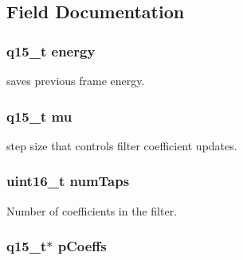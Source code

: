 \subsection{Field Documentation}
\hypertarget{structarm__lms__norm__instance__q15_ae7a8ccabc82348f6742ca7a2b3da2a41}{
\subsubsection[{energy}]{\setlength{\rightskip}{0pt plus 5cm}q15\-\_\-t energy}}\label{structarm__lms__norm__instance__q15_ae7a8ccabc82348f6742ca7a2b3da2a41}
saves previous frame energy. \hypertarget{structarm__lms__norm__instance__q15_aab4745770bd667de040227eec1b5ff8d}{
\subsubsection[{mu}]{\setlength{\rightskip}{0pt plus 5cm}q15\-\_\-t mu}}\label{structarm__lms__norm__instance__q15_aab4745770bd667de040227eec1b5ff8d}
step size that controls filter coefficient updates. \hypertarget{structarm__lms__norm__instance__q15_a751941891e47f522a7f5375fe8990aac}{
\subsubsection[{num\-Taps}]{\setlength{\rightskip}{0pt plus 5cm}uint16\-\_\-t num\-Taps}}\label{structarm__lms__norm__instance__q15_a751941891e47f522a7f5375fe8990aac}
Number of coefficients in the filter. \hypertarget{structarm__lms__norm__instance__q15_a7ca181a37f714d174445f486bebce26f}{
\subsubsection[{p\-Coeffs}]{\setlength{\rightskip}{0pt plus 5cm}q15\-\_\-t$\ast$ p\-Coeffs}}\label{structarm__lms__norm__instance__q15_a7ca181a37f714d174445f486bebce26f}
